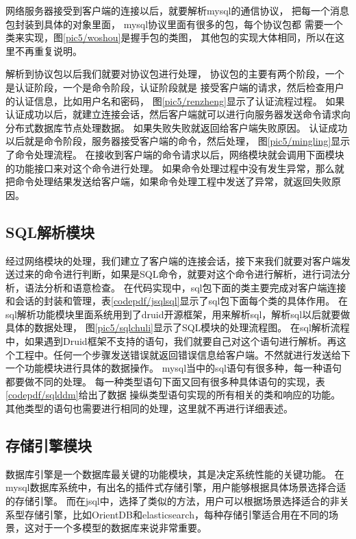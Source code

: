 网络服务器接受到客户端的连接以后，就要解析mysql的通信协议，
把每一个消息包封装到具体的对象里面，
mysql协议里面有很多的包，每个协议包都
需要一个类来实现，图\ref{pic5/woshou}是握手包的类图，
其他包的实现大体相同，所以在这里不再重复说明。

解析到协议包以后我们就要对协议包进行处理，
协议包的主要有两个阶段，一个是认证阶段，一个是命令阶段，认证阶段就是
接受客户端的请求，然后检查用户的认证信息，比如用户名和密码，
图\ref{pic5/renzheng}显示了认证流程过程。
如果认证成功以后，就建立连接会话，然后客户端就可以进行向服务器发送命令请求向分布式数据库节点处理数据。
如果失败失败就返回给客户端失败原因。
认证成功以后就是命令阶段，服务器接受客户端的命令，然后处理，
图\ref{pic5/mingling}显示了命令处理流程。
在接收到客户端的命令请求以后，网络模块就会调用下面模块的功能接口来对这个命令进行处理。
如果命令处理过程中没有发生异常，那么就把命令处理结果发送给客户端，如果命令处理工程中发送了异常，就返回失败原因。
\subsection{SQL解析模块}
经过网络模块的处理，我们建立了客户端的连接会话，接下来我们就要对客户端发送过来的命令进行判断，如果是SQL命令，就要对这个命令进行解析，进行词法分析，语法分析和语意检查。
在代码实现中，sql包下面的类主要完成对客户端连接和会话的封装和管理，表\ref{codepdf/jsqlsql}显示了sql包下面每个类的具体作用。
在sql解析功能模块里面系统用到了druid开源框架，用来解析sql，解析sql以后就要做具体的数据处理，
图\ref{pic5/sqlchuli}显示了SQL模块的处理流程图。
在sql解析流程中，如果遇到Druid框架不支持的语句，我们就要自己对这个语句进行解析。再这个工程中。任何一个步骤发送错误就返回错误信息给客户端。不然就进行发送给下一个功能模块进行具体的数据操作。
mysql当中的sql语句有很多种，每一种语句都要做不同的处理。
每一种类型语句下面又回有很多种具体语句的实现，表\ref{codepdf/sqlddm}给出了数据
操纵类型语句实现的所有相关的类和响应的功能。
其他类型的语句也需要进行相同的处理，这里就不再进行详细表述。
\subsection{存储引擎模块}
数据库引擎是一个数据库最关键的功能模块，其是决定系统性能的关键功能。
在mysql数据库系统中，有出名的插件式存储引擎，用户能够根据具体场景选择合适的存储引擎。
而在jsql中，选择了类似的方法，用户可以根据场景选择适合的非关系型存储引擎，比如OrientDB和elasticsearch，每种存储引擎适合用在不同的场景，这对于一个多模型的数据库来说非常重要。


